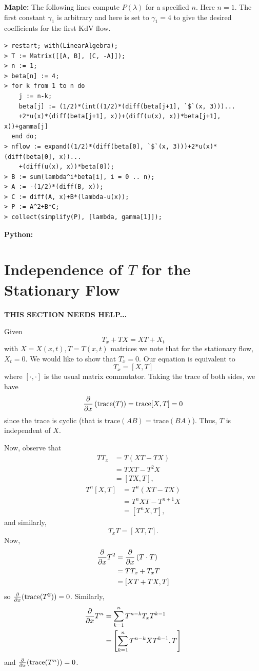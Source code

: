 \documentclass[12pt, a4paper]{article}
\newcommand{\tr}{\text{trace}}
\newcommand{\pp}[2]{{\partial #1 \over \partial #2}}
\begin{document}
\textbf{Maple:} The following lines compute $P(\lambda)$ for a specified
$n$. Here $n = 1$. The first constant $\gamma_1$ is arbitrary and here
is set to $\gamma_1 = 4$ to give the desired coefficients for the first
KdV flow.
\begin{verbatim}
> restart; with(LinearAlgebra);
> T := Matrix([[A, B], [C, -A]]);
> n := 1;
> beta[n] := 4;
> for k from 1 to n do
    j := n-k;
    beta[j] := (1/2)*(int((1/2)*(diff(beta[j+1], `$`(x, 3)))...
    +2*u(x)*(diff(beta[j+1], x))+(diff(u(x), x))*beta[j+1], x))+gamma[j]
  end do;
> nflow := expand((1/2)*(diff(beta[0], `$`(x, 3)))+2*u(x)*(diff(beta[0], x))...
    +(diff(u(x), x))*beta[0]);
> B := sum(lambda^i*beta[i], i = 0 .. n);
> A := -(1/2)*(diff(B, x));
> C := diff(A, x)+B*(lambda-u(x));
> P := A^2+B*C;
> collect(simplify(P), [lambda, gamma[1]]);
\end{verbatim}

\textbf{Python:}



\section{Independence of $T$ for the Stationary Flow}\label{det/trace}



\textbf{THIS SECTION NEEDS HELP...}


Given
\[
  T_x +T X = XT + X_t
\]
with $X=X(x,t),T=T(x,t)$ matrices we note that for the stationary flow,
$X_t=0$.  We would like to show that $T_x=0$. Our equation is equivalent to 
\[
  T_x = [X,T]
\]
where $[\cdot,\cdot]$ is the usual matrix commutator. Taking the trace
of both sides, we have
\[
  \pp{}{x} \left( \tr(T) \right) = \tr[X,T] = 0
\]
since the trace is cyclic (that is $\tr(AB) = \tr(BA)$).  Thus, $T$ is
independent of $X$.

Now, observe that
\begin{align*}
  TT_x &= T(XT-TX) \\
       &= TXT-T^2X \\
       &= [TX,T],
\end{align*}
\begin{align*}
  T^n[X,T] &= T^n(XT-TX) \\
           &= T^nXT - T^{n+1}X \\
           &= [T^nX, T],
\end{align*}
and similarly,
\[
  T_x T = [XT,T].
\]
Now,
\begin{align*}
  \pp{}{x}T^2 &= \pp{}{x} \left(T \cdot T \right) \\
              &= TT_x + T_xT \\
              &= [XT+TX, T]
\end{align*}
so $\pp{}{x}(\tr (T^2))=0$. Similarly,
\begin{align*}
  \pp{}{x}T^n &= \sum_{k=1}^n T^{n-k} T_x T^{k-1} \\
              &= \left[ \sum_{k=1}^n T^{n-k} X T^{k-1}, T \right]
\end{align*}
and $\pp{}{x}(\tr (T^n))=0$.
\end{document}
